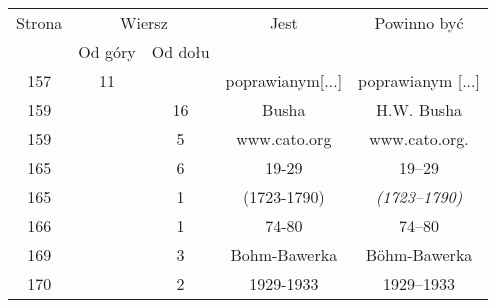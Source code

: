 \documentclass[a4paper,11pt]{article}
\begin{document}
\begin{center}

  \begin{tabular}{|c|c|c|c|c|}
    \hline
    Strona & \multicolumn{2}{c|}{Wiersz} & Jest
                              & Powinno być \\ \cline{2-3}
    & Od góry & Od dołu & & \\
    \hline
    157 & 11 & & poprawianym[...] & poprawianym [...] \\
    159 & & 16 & Busha & H.W. Busha \\
    159 & &  5 & www.cato.org & www.cato.org. \\
    165 & &  6 & 19-29 & 19--29 \\
    165 & &  1 & (1723-1790) & \textit{(1723--1790)} \\
    166 & &  1 & 74-80 & 74--80 \\
    169 & &  3 & Bohm-Bawerka & B\"{o}hm-Bawerka \\
    170 & &  2 & 1929-1933 & 1929--1933 \\
    \hline
  \end{tabular}






\end{center}
\end{document}

